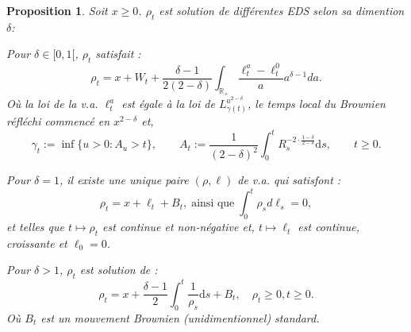 \documentclass[openany]{book}
\newcommand{\R}{\mathbb{R}}
\newcommand{\1}{\mathbbm{1}}
\renewcommand{\d}{\mathrm{d}}
\theoremstyle{thmfont}
\theoremstyle{deffont}
\theoremstyle{thmfont}
\newtheorem{prop}[prop]{Proposition}
\theoremstyle{deffont}
\begin{document}
\begin{prop} Soit $x \geq 0$. $\rho_t$ est solution de différentes EDS selon sa dimention $\delta$:
  \begin{enumerate}
    \item Pour $\delta \in [0,1[$, $\rho_t$ satisfait :
     \begin{equation}
       \rho_t = x + W_t + \dfrac{\delta-1}{2(2-\delta)}\int_{\R_+} \dfrac{\ell_t^a- \ell_t^0}{a}a^{\delta-1} da .
       \label{eq:EDSBessel3}
     \end{equation}
     \noindent Où la loi de la v.a. $\ell_t^a$ est égale à la loi de $L_{\gamma(t)}^{a^{2-\delta}}$, le temps local du Brownien réfléchi commencé en $x^{2-\delta}$ et,
     $$\gamma_t := \inf\{u > 0 : A_u > t\}, \qquad
     A_t := \frac{1}{(2 - \delta)^2} \int_0^t R_s^{-2 \cdot \frac{1 - \delta}{2 - \delta}} \d s, \qquad t \geq 0.$$
   {\color{purple}
   \item Pour $\delta =1$, il existe une unique paire $(\rho, \ell)$ de v.a. qui satisfont :
     \begin{equation}
       \rho_t = x + \ell_t + B_t, \;\text{ainsi que}\; \int_0^t \rho_s d\ell_s = 0,
       \label{eq:EDSBessel2}
     \end{equation}
     \noindent et telles que $t\mapsto \rho_t$ est continue et non-négative et, $t \mapsto \ell_t$ est continue, croissante et $\ell_0 = 0$.\\
   \item Pour $\delta > 1$, $\rho_t$ est solution de :
     \begin{equation}
       \rho_t = x + \dfrac{\delta-1}{2}\int_0^t \dfrac{1}{\rho_s} \d s + B_t, \quad \rho_t \geq 0, t \geq 0.
       \label{eq:EDSBessel1}
     \end{equation}
     \noindent Où $B_t$ est un mouvement Brownien (unidimentionnel) standard.\\}
\end{enumerate}
\end{prop}
\end{document}
